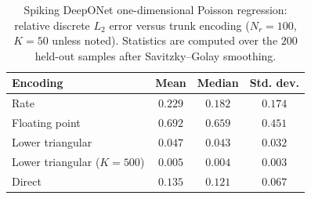 \begin{table}[t]
  \centering
  \caption{Spiking DeepONet one-dimensional Poisson regression: relative discrete $L_2$ error versus trunk encoding ($N_r=100$, $K=50$ unless noted). Statistics are computed over the $200$ held-out samples after Savitzky--Golay smoothing.}
  \label{tab:ch02:deeponet-encoding}
  \small
  \begin{tabular}{@{}lccc@{}}
    \toprule
    Encoding & Mean & Median & Std. dev. \\
    \midrule
    Rate & $0.229$ & $0.182$ & $0.174$ \\
    Floating point & $0.692$ & $0.659$ & $0.451$ \\
    Lower triangular & $0.047$ & $0.043$ & $0.032$ \\
    Lower triangular ($K=500$) & $\mathbf{0.005}$ & $\mathbf{0.004}$ & $\mathbf{0.003}$ \\
    Direct & $0.135$ & $0.121$ & $0.067$ \\
    \bottomrule
  \end{tabular}
\end{table}
